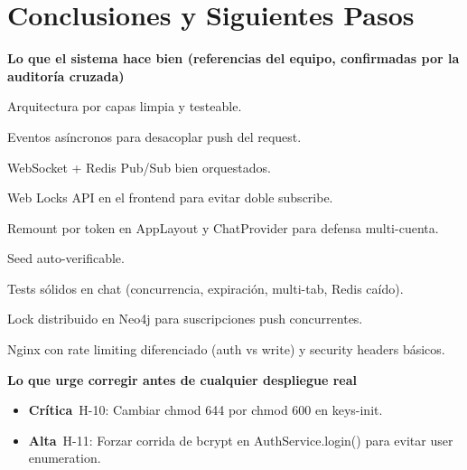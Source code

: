 \documentclass[10pt,a4paper]{article}
\newcommand{\badgeCritica}{\colorbox{red!20}{\textcolor{red!80!black}{\textbf{\footnotesize Crítica}}}}
\newcommand{\badgeAlta}{\colorbox{orange!20}{\textcolor{orange!90!black}{\textbf{\footnotesize Alta}}}}
\begin{document}
\section*{Conclusiones y Siguientes Pasos}
\vspace{0.8em}\noindent\textbf{\large Lo que el sistema hace bien (referencias del equipo, confirmadas por la auditoría cruzada)}\par\vspace{0.4em}
Arquitectura por capas limpia y testeable.\par\vspace{0.4em}
Eventos asíncronos para desacoplar push del request.\par\vspace{0.4em}
WebSocket + Redis Pub/Sub bien orquestados.\par\vspace{0.4em}
Web Locks API en el frontend para evitar doble subscribe.\par\vspace{0.4em}
Remount por token en AppLayout y ChatProvider para defensa multi-cuenta.\par\vspace{0.4em}
Seed auto-verificable.\par\vspace{0.4em}
Tests sólidos en chat (concurrencia, expiración, multi-tab, Redis caído).\par\vspace{0.4em}
Lock distribuido en Neo4j para suscripciones push concurrentes.\par\vspace{0.4em}
Nginx con rate limiting diferenciado (auth vs write) y security headers básicos.\par\vspace{0.4em}
\vspace{0.8em}\noindent\textbf{\large Lo que urge corregir antes de cualquier despliegue real}\par\vspace{0.4em}
\begin{itemize}[leftmargin=1.5em,noitemsep,topsep=0pt]\item \badgeCritica\  H-10: Cambiar chmod 644 por chmod 600 en keys-init.\end{itemize}
\begin{itemize}[leftmargin=1.5em,noitemsep,topsep=0pt]\item \badgeAlta\  H-11: Forzar corrida de bcrypt en AuthService.login() para evitar user enumeration.\end{itemize}
\end{document}
